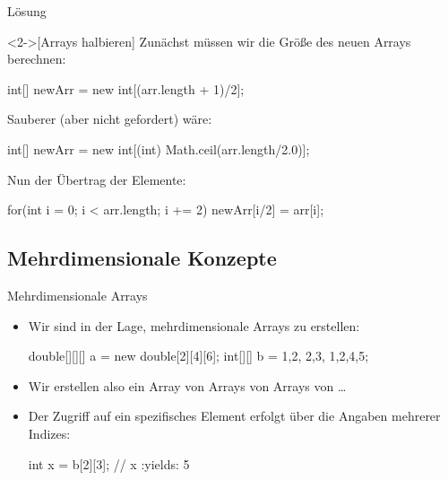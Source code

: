 \begin{frame}[c,fragile]{Lösung}
    \begin{solve}<2->[Arrays halbieren]
    Zunächst müssen wir die Größe des neuen Arrays berechnen:
\begin{plainjava}
int[] newArr = new int[(arr.length + 1)/2];
\end{plainjava}
    Sauberer (aber nicht gefordert) wäre:
\begin{plainjava}
int[] newArr = new int[(int) Math.ceil(arr.length/2.0)];
\end{plainjava}
    Nun der Übertrag der Elemente:
\begin{plainjava}
for(int i = 0; i < arr.length; i += 2) {
    newArr[i/2] = arr[i];
}
\end{plainjava}
    \end{solve}
\end{frame}

\fi


\subsection{Mehrdimensionale Konzepte}%

\begin{frame}[fragile]{Mehrdimensionale Arrays}
    \begin{itemize}[<+(1)->]
        \widei
        \item Wir sind in der Lage, mehrdimensionale Arrays zu erstellen:\pause{}
\begin{plainjava}
double[][][] a = new double[2][4][6];
int[][] b = {{1,2}, {2,3}, {1,2,4,5}};
\end{plainjava}
        \item Wir erstellen also ein Array von Arrays von Arrays von \ldots
        \item Der Zugriff auf ein spezifisches Element erfolgt über die Angaben mehrerer Indizes:
\begin{plainjava}
int x = b[2][3]; // x :yields: 5
\end{plainjava}
    \end{itemize}
\end{frame}

